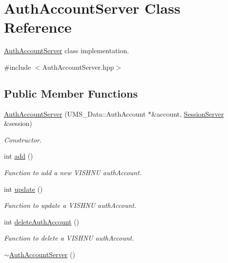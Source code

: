\hypertarget{classAuthAccountServer}{
\section{AuthAccountServer Class Reference}
\label{classAuthAccountServer}
}


\hyperlink{classAuthAccountServer}{AuthAccountServer} class implementation.  




{\ttfamily \#include $<$AuthAccountServer.hpp$>$}

\subsection*{Public Member Functions}
\begin{DoxyCompactItemize}
\item 
\hyperlink{classAuthAccountServer_ab4a25981470df4ec4cd3be2ffcbc6833}{AuthAccountServer} (UMS\_\-Data::AuthAccount $\ast$\&account, \hyperlink{classSessionServer}{SessionServer} \&session)
\begin{DoxyCompactList}\small\item\em Constructor. \item\end{DoxyCompactList}\item 
int \hyperlink{classAuthAccountServer_a9077e2f1b0fe7e7f96d867c7ecc199c3}{add} ()
\begin{DoxyCompactList}\small\item\em Function to add a new VISHNU authAccount. \item\end{DoxyCompactList}\item 
int \hyperlink{classAuthAccountServer_ac436fe62e92927384bdf1b288e8f410e}{update} ()
\begin{DoxyCompactList}\small\item\em Function to update a VISHNU authAccount. \item\end{DoxyCompactList}\item 
int \hyperlink{classAuthAccountServer_a99d011a6449a7cbbcdf9b630cacbe243}{deleteAuthAccount} ()
\begin{DoxyCompactList}\small\item\em Function to delete a VISHNU authAccount. \item\end{DoxyCompactList}\item 
\hypertarget{classAuthAccountServer_a64db8865f23f61952f0ce032c8c4bda5}{
\hyperlink{classAuthAccountServer_a64db8865f23f61952f0ce032c8c4bda5}{$\sim$AuthAccountServer} ()}
\label{classAuthAccountServer_a64db8865f23f61952f0ce032c8c4bda5}


\end{DoxyCompactItemize}
